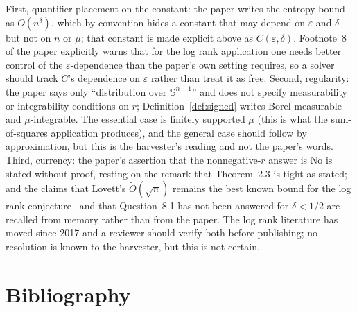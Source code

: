 \documentclass{conjura-conjecture}
\newcommand{\Sph}{\mathbb{S}^{n-1}}
\newcommand{\Ot}{\tilde{O}}
\begin{document}
\begin{remark}\label{rem:reading}
First, quantifier placement on the constant: the paper writes the
entropy bound as $O(n^{\delta})$, which by convention hides a constant
that may depend on $\varepsilon$ and $\delta$ but not on $n$ or $\mu$;
that constant is made explicit above as $C(\varepsilon, \delta)$.
Footnote~8 of the paper explicitly warns that for the log rank
application one needs better control of the $\varepsilon$-dependence
than the paper's own setting requires, so a solver should track $C$'s
dependence on $\varepsilon$ rather than treat it as free. Second,
regularity: the paper says only ``distribution over $\Sph$'' and does
not specify measurability or integrability conditions on $r$;
Definition~\ref{def:signed} writes Borel measurable and
$\mu$-integrable. The essential case is finitely supported $\mu$
(this is what the sum-of-squares application produces), and the
general case should follow by approximation, but this is the
harvester's reading and not the paper's words. Third, currency: the
paper's assertion that the nonnegative-$r$ answer is No is stated
without proof, resting on the remark that Theorem~2.3 is tight as
stated; and the claims that Lovett's $\Ot(\sqrt{n})$ remains the best
known bound for the log rank conjecture~\cite{Lov14} and that
Question~8.1 has not been answered for $\delta < 1/2$ are recalled
from memory rather than from the paper. The log rank literature has
moved since 2017 and a reviewer should verify both before publishing;
no resolution is known to the harvester, but this is not certain.
\end{remark}

\section{Bibliography}
\end{document}
